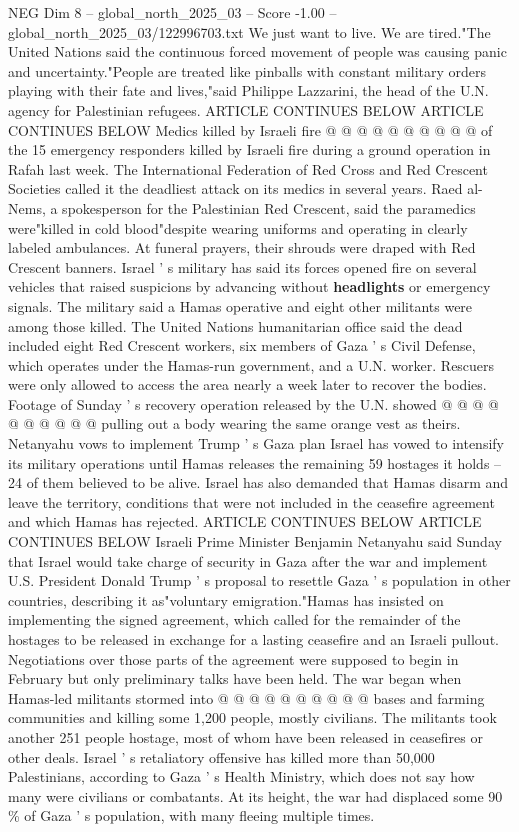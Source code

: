 \begin{textsample}{NEG Dim 8 – global\_north\_2025\_03 – Score -1.00 – global\_north\_2025\_03/122996703.txt}
We just want to live.
We are tired."The United Nations said the continuous forced movement of people was causing panic and uncertainty."People are treated like pinballs with constant military orders playing with their fate and lives,"said Philippe Lazzarini, the head of the U.N. agency for Palestinian refugees.
ARTICLE CONTINUES BELOW ARTICLE CONTINUES BELOW Medics killed by Israeli fire @ @ @ @ @ @ @ @ @ @ of the 15 emergency responders killed by Israeli fire during a ground operation in Rafah last week.
The International Federation of Red Cross and Red Crescent Societies called it the deadliest attack on its medics in several years.
Raed al-Nems, a spokesperson for the Palestinian Red Crescent, said the paramedics were"killed in cold blood"despite wearing uniforms and operating in clearly labeled ambulances.
At funeral prayers, their shrouds were draped with Red Crescent banners.
Israel ' s military has said its forces opened fire on several vehicles that raised suspicions by advancing without \textbf{headlights} or emergency signals.
The military said a Hamas operative and eight other militants were among those killed.
The United Nations humanitarian office said the dead included eight Red Crescent workers, six members of Gaza ' s Civil Defense, which operates under the Hamas-run government, and a U.N. worker.
Rescuers were only allowed to access the area nearly a week later to recover the bodies.
Footage of Sunday ' s recovery operation released by the U.N. showed @ @ @ @ @ @ @ @ @ @ pulling out a body wearing the same orange vest as theirs.
Netanyahu vows to implement Trump ' s Gaza plan Israel has vowed to intensify its military operations until Hamas releases the remaining 59 hostages it holds -- 24 of them believed to be alive.
Israel has also demanded that Hamas disarm and leave the territory, conditions that were not included in the ceasefire agreement and which Hamas has rejected.
ARTICLE CONTINUES BELOW ARTICLE CONTINUES BELOW Israeli Prime Minister Benjamin Netanyahu said Sunday that Israel would take charge of security in Gaza after the war and implement U.S.
President Donald Trump ' s proposal to resettle Gaza ' s population in other countries, describing it as"voluntary emigration."Hamas has insisted on implementing the signed agreement, which called for the remainder of the hostages to be released in exchange for a lasting ceasefire and an Israeli pullout.
Negotiations over those parts of the agreement were supposed to begin in February but only preliminary talks have been held.
The war began when Hamas-led militants stormed into @ @ @ @ @ @ @ @ @ @ bases and farming communities and killing some 1,200 people, mostly civilians.
The militants took another 251 people hostage, most of whom have been released in ceasefires or other deals.
Israel ' s retaliatory offensive has killed more than 50,000 Palestinians, according to Gaza ' s Health Ministry, which does not say how many were civilians or combatants.
At its height, the war had displaced some 90 \% of Gaza ' s population, with many fleeing multiple times.

\end{textsample}
